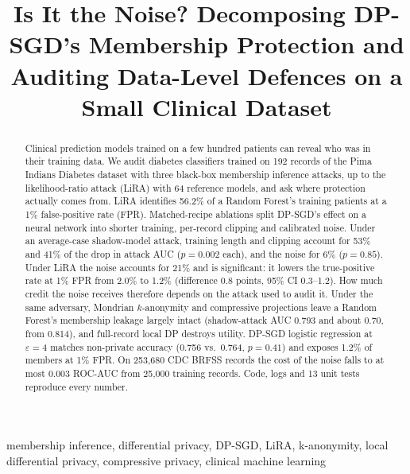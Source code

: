 \documentclass[conference]{IEEEtran}
\newcommand{\eps}{\varepsilon}
\begin{document}
\title{Is It the Noise? Decomposing DP-SGD's Membership Protection and Auditing Data-Level Defences on a Small Clinical Dataset}

\author{
}

\maketitle

\begin{abstract}
Clinical prediction models trained on a few hundred patients can reveal who was in their training data. We audit diabetes classifiers trained on 192 records of the Pima Indians Diabetes dataset with three black-box membership inference attacks, up to the likelihood-ratio attack (LiRA) with 64 reference models, and ask where protection actually comes from. LiRA identifies 56.2\% of a Random Forest's training patients at a 1\% false-positive rate (FPR). Matched-recipe ablations split DP-SGD's effect on a neural network into shorter training, per-record clipping and calibrated noise. Under an average-case shadow-model attack, training length and clipping account for 53\% and 41\% of the drop in attack AUC ($p{=}0.002$ each), and the noise for 6\% ($p{=}0.85$). Under LiRA the noise accounts for 21\% and is significant: it lowers the true-positive rate at 1\% FPR from 2.0\% to 1.2\% (difference 0.8 points, 95\% CI 0.3--1.2). How much credit the noise receives therefore depends on the attack used to audit it. Under the same adversary, Mondrian $k$-anonymity and compressive projections leave a Random Forest's membership leakage largely intact (shadow-attack AUC 0.793 and about 0.70, from 0.814), and full-record local DP destroys utility. DP-SGD logistic regression at $\eps{=}4$ matches non-private accuracy (0.756 vs.\ 0.764, $p{=}0.41$) and exposes 1.2\% of members at 1\% FPR. On 253{,}680 CDC BRFSS records the cost of the noise falls to at most 0.003 ROC-AUC from 25{,}000 training records. Code, logs and 13 unit tests reproduce every number.
\end{abstract}

\begin{IEEEkeywords}
membership inference, differential privacy, DP-SGD, LiRA, k-anonymity, local differential privacy, compressive privacy, clinical machine learning
\end{IEEEkeywords}
\end{document}
